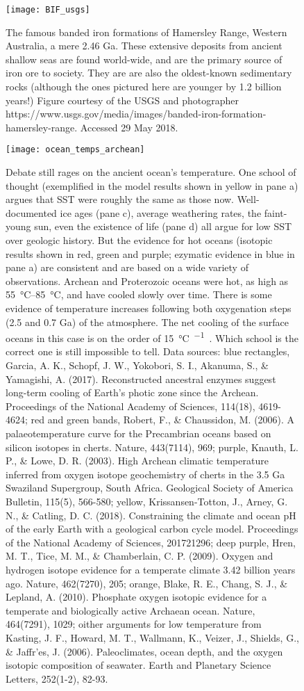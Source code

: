 {\newpage
\begin{figure}[ht]
\centering
\texttt{[image: BIF\_usgs]}%
\caption{The famous banded iron formations of Hamersley Range, Western Australia, a mere 2.46 Ga. These extensive deposits from ancient shallow seas are found world-wide, and are the primary source of iron ore to society. They are are also the oldest-known sedimentary rocks (although the ones pictured here are younger by 1.2 billion years!) Figure courtesy of the USGS and photographer https://www.usgs.gov/media/images/banded-iron-formation-hamersley-range. Accessed 29 May 2018.}   
\label{fig:bif}
\end{figure}


\newpage
\begin{figure}[ht]
\centering
\texttt{[image: ocean\_temps\_archean]}%
\caption{Debate still rages on the ancient ocean's temperature. One school of thought (exemplified in the model results shown in yellow in pane a) argues that SST were roughly the same as those now. Well-documented ice ages (pane c), average weathering rates, the faint-young sun, even the existence of life (pane d) all argue for low SST over geologic history. But the evidence for hot oceans (isotopic results shown in red, green and purple; ezymatic evidence in blue in pane a) are consistent and are based on a wide variety of observations. Archean and Proterozoic oceans were hot, as high as \SIrange{55}{85}{\celsius}, and have cooled slowly over time. There is some evidence of temperature increases following both oxygenation steps (2.5 and 0.7 Ga) of the atmosphere. The net cooling of the surface oceans in this case is on the order of \SI[per-mode=symbol]{15}{\celsius\per\giga\year}. Which school is the correct one is still impossible to tell. Data sources: blue rectangles, Garcia, A. K., Schopf, J. W., Yokobori, S. I., Akanuma, S., \& Yamagishi, A. (2017). Reconstructed ancestral enzymes suggest long-term cooling of Earth's photic zone since the Archean. Proceedings of the National Academy of Sciences, 114(18), 4619-4624; red and green bands, Robert, F., \& Chaussidon, M. (2006). A palaeotemperature curve for the Precambrian oceans based on silicon isotopes in cherts. Nature, 443(7114), 969; purple, Knauth, L. P., \& Lowe, D. R. (2003). High Archean climatic temperature inferred from oxygen isotope geochemistry of cherts in the 3.5 Ga Swaziland Supergroup, South Africa. Geological Society of America Bulletin, 115(5), 566-580; yellow, Krissansen-Totton, J., Arney, G. N., \& Catling, D. C. (2018). Constraining the climate and ocean pH of the early Earth with a geological carbon cycle model. Proceedings of the National Academy of Sciences, 201721296; deep purple, Hren, M. T., Tice, M. M., \& Chamberlain, C. P. (2009). Oxygen and hydrogen isotope evidence for a temperate climate 3.42 billion years ago. Nature, 462(7270), 205; orange, Blake, R. E., Chang, S. J., \& Lepland, A. (2010). Phosphate oxygen isotopic evidence for a temperate and biologically active Archaean ocean. Nature, 464(7291), 1029; oither arguments for low temperature from Kasting, J. F., Howard, M. T., Wallmann, K., Veizer, J., Shields, G., \& Jaffr'es, J. (2006). Paleoclimates, ocean depth, and the oxygen isotopic composition of seawater. Earth and Planetary Science Letters, 252(1-2), 82-93.}   

\end{figure}}
